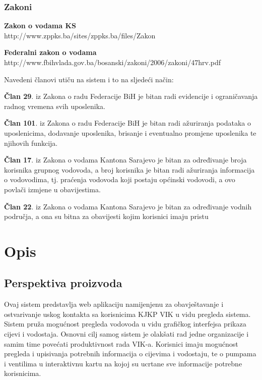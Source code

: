 \documentclass[]{report}
\begin{document}
\subsection{Zakoni} 
\begin{compactitem}
\item \textbf{Zakon o vodama KS}\\
http://www.zppks.ba/sites/zppks.ba/files/Zakon%
 
\item \textbf{Federalni zakon o vodama}\\
http://www.fbihvlada.gov.ba/bosanski/zakoni/2006/zakoni/47hrv.pdf 

Navedeni članovi utiču na sistem i to na sljedeći način: 
 
\begin{compactitem}
\item \textbf{Član 29}. iz Zakona o radu Federacije BiH je bitan radi evidencije i ograničavanja radnog vremena svih uposlenika. 
\item \textbf{Član 101}. iz Zakona o radu Federacije BiH je bitan radi ažuriranja podataka o uposlenicima, dodavanje uposlenika, brisanje i eventualno promjene uposlenika te njihovih funkcija. 
\item \textbf{Član 17}. iz Zakona o vodama Kantona Sarajevo je bitan za određivanje broja korisnika grupnog vodovoda, a broj korisnika je bitan radi ažuriranja informacija o vodovodima, tj. praćenja vodovoda koji postaju općinski vodovodi, a ovo povlači izmjene u obavijestima. 
\item \textbf{Član 22}. iz Zakona o vodama Kantona Sarajevo je bitan za određivanje vodnih područja, a ona su bitna za obavijesti kojim korisnici imaju pristu
\end{compactitem}

\end{compactitem}

\begingroup
\renewcommand{\cleardoublepage}{}
\renewcommand{\clearpage}{}
\chapter{Opis}
\endgroup

\section{Perspektiva proizvoda}
Ovaj sistem predstavlja web aplikaciju namijenjenu za obavještavanje i ostvarivanje uskog kontakta sa korisnicima KJKP VIK u vidu pregleda sistema. Sistem pruža mogućnost pregleda vodovoda u vidu grafičkog interfejsa prikaza cijevi i vodostaja. Osnovni cilj samog sistem je olakšati rad jedne organizacije i samim time povećati produktivnost rada VIK-a. Korisnici imaju mogućnost pregleda i upisivanja potrebnih informacija o cijevima i vodostaju, te o pumpama i ventilima u interaktivnu kartu na kojoj su ucrtane sve informacije potrebne korisnicima. 
\end{document}
